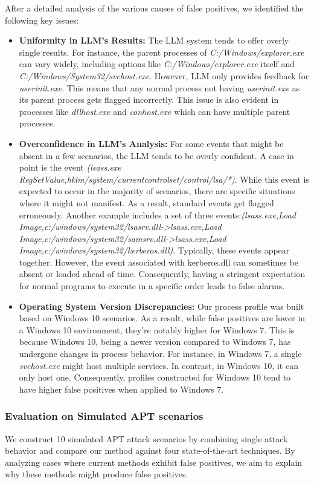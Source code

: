 \smallskip
{}
After a detailed analysis of the various causes of false positives, we identified the following key issues:

\begin{itemize}
    \item \textbf{Uniformity in LLM's Results:} The LLM system tends to offer overly single results. For instance, the parent processes of \textit{C:/Windows/explorer.exe} can vary widely, including options like \textit{C:/Windows/explorer.exe} itself and \textit{C:/Windows/System32/svchost.exe}. However, LLM only provides feedback for \textit{userinit.exe}. This means that any normal process not having \textit{userinit.exe} as its parent process gets flagged incorrectly. This issue is also evident in processes like \textit{dllhost.exe} and \textit{conhost.exe} which can have multiple parent processes.
    \item \textbf{Overconfidence in LLM's Analysis:} For some events that might be absent in a few scenarios, the LLM tends to be overly confident. A case in point is the event \textit{(lsass.exe RegSetValue,hklm/system/currentcontrolset/control/lsa/*)}. While this event is expected to occur in the majority of scenarios, there are specific situations where it might not manifest. As a result, standard events get flagged erroneously. Another example includes a set of three events:\textit{(lsass.exe,Load Image,c:/windows/system32/lsasrv.dll->lsass.exe,Load Image,c:/windows/system32/samsrv.dll->lsass.exe,Load Image,c:/windows/system32/kerberos.dll)}. Typically, these events appear together. However, the event associated with kerberos.dll can sometimes be absent or loaded ahead of time. Consequently, having a stringent expectation for normal programs to execute in a specific order leads to false alarms.
    \item \textbf{Operating System Version Discrepancies:} Our process profile was built based on Windows 10 scenarios. As a result, while false positives are lower in a Windows 10 environment, they're notably higher for Windows 7. This is because Windows 10, being a newer version compared to Windows 7, has undergone changes in process behavior. For instance, in Windows 7, a single \textit{svchost.exe} might host multiple services. In contrast, in Windows 10, it can only host one. Consequently, profiles constructed for Windows 10 tend to have higher false positives when applied to Windows 7.
\end{itemize}


\subsubsection{Evaluation on Simulated APT scenarios}
We construct 10 simulated APT attack scenarios by combining single attack behavior and compare our method against four state-of-the-art techniques. By analyzing cases where current methods exhibit false positives, we aim to explain why these methods might produce false positives.

